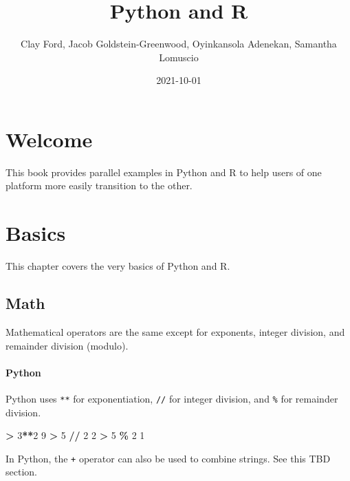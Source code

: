 \documentclass[
]{book}
\title{Python and R}
\author{Clay Ford, Jacob Goldstein-Greenwood, Oyinkansola Adenekan, Samantha Lomuscio}
\date{2021-10-01}
\newenvironment{Shaded}{\begin{snugshade}}{\end{snugshade}}
\newcommand{\DecValTok}[1]{\textcolor[rgb]{0.00,0.00,0.81}{#1}}
\newcommand{\OperatorTok}[1]{\textcolor[rgb]{0.81,0.36,0.00}{\textbf{#1}}}
\begin{document}
\maketitle

{
\setcounter{tocdepth}{1}
\tableofcontents
}
\hypertarget{welcome}{%
\chapter*{Welcome}\label{welcome}}

This book provides parallel examples in Python and R to help users of one platform more easily transition to the other.

\hypertarget{basics}{%
\chapter{Basics}\label{basics}}

This chapter covers the very basics of Python and R.

\hypertarget{math}{%
\section{Math}\label{math}}

Mathematical operators are the same except for exponents, integer division, and remainder division (modulo).

\hypertarget{python}{%
\subsubsection*{Python}\label{python}}

Python uses \texttt{**} for exponentiation, \texttt{//} for integer division, and \texttt{\%} for remainder division.

\begin{Shaded}
\begin{Highlighting}[]
\OperatorTok{\textgreater{}} \DecValTok{3}\OperatorTok{**}\DecValTok{2}
\DecValTok{9}
\OperatorTok{\textgreater{}} \DecValTok{5} \OperatorTok{//} \DecValTok{2}
\DecValTok{2}
\OperatorTok{\textgreater{}} \DecValTok{5} \OperatorTok{\%} \DecValTok{2}
\DecValTok{1}
\end{Highlighting}
\end{Shaded}

In Python, the \texttt{+} operator can also be used to combine strings. See this TBD section.
\end{document}
